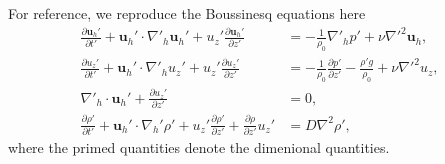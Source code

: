 For reference, we reproduce the Boussinesq equations here 
\begin{align}
\frac{\partial \textbf{u}_{h}'}{\partial t'} + \textbf{u}_{h}'\cdot\nabla'_{h}\textbf{u}_{h}'+u_{z}'\frac{\partial \textbf{u}_{h}'}{\partial z'} &= -\frac{1}{\rho_{0}}\nabla'_{h}p' + \nu \nabla'^{2}\textbf{u}_{h},\\
\frac{\partial u_{z}'}{\partial t'} + \textbf{u}_{h}'\cdot\nabla'_{h}u_{z}'+u_{z}'\frac{\partial u_{z}'}{\partial z'} &= -\frac{1}{\rho_{0}}\frac{\partial p'}{\partial z'} - \frac{\rho' g}{\rho_{0}} + \nu \nabla'^{2}u_{z},\\
\nabla'_{h}\cdot\textbf{u}_{h}' + \frac{\partial u_{z}'}{\partial z'} &=0,\\
\frac{\partial \rho'}{\partial t'} + \textbf{u}_{h}'\cdot\nabla_{h}'\rho' + u_{z}'\frac{\partial \rho'}{\partial z'} + \frac{\partial \rho}{\partial z'}u_{z}'&=D\nabla^{2}\rho ',
\end{align}
where the primed quantities denote the dimenional quantities. 

